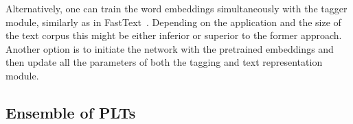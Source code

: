 \documentclass{article}
\newcommand{\Algo}[1]{\textsc{#1}}
\newcommand{\sectionBefore}{-0pt}
\newcommand{\sectionAfter}{-0pt}
\begin{document}
Alternatively, one can train the word embeddings simultaneously with the tagger module, similarly as in FastText~\citep{Joulin_et_al_2016}. Depending on the application and the size of the text corpus this might be either inferior or superior to the former approach. Another option is to initiate the network with the pretrained embeddings and then update all the parameters of both the tagging and text representation module. 


% 		




\vspace{\sectionBefore}
\subsection{Ensemble of PLTs}
\label{sec:plt-ensemble}
\vspace{\sectionAfter}
\end{document}
